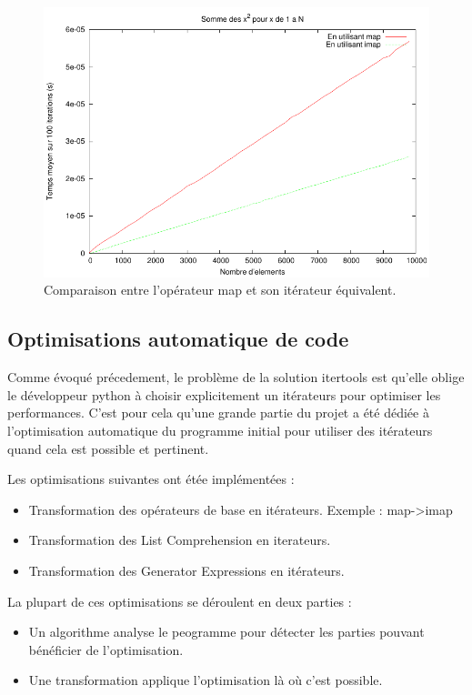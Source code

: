 \documentclass[a4paper]{article}
\begin{document}
\begin{figure}[h]
  \includegraphics[width=\textwidth]{MapImap}
  \caption{Comparaison entre l'opérateur map et son itérateur équivalent.}
\end{figure}


\subsection*{Optimisations automatique de code}

Comme évoqué précedement, le problème de la solution itertools est
qu'elle oblige le développeur python à choisir explicitement un
itérateurs pour optimiser les performances. C'est pour cela qu'une
grande partie du projet a été dédiée à l'optimisation automatique du
programme initial pour utiliser des itérateurs quand cela est possible
et pertinent.

Les optimisations suivantes ont étée implémentées :

\begin{itemize}
\item Transformation des opérateurs de base en itérateurs. Exemple :
  map->imap
\item Transformation des List Comprehension en iterateurs.
\item Transformation des Generator Expressions en itérateurs.
\end{itemize}

La plupart de ces optimisations se déroulent en deux parties :

\begin{itemize}
\item Un algorithme analyse le peogramme pour détecter les parties
  pouvant bénéficier de l'optimisation.
\item Une transformation applique l'optimisation là où c'est possible.
\end{itemize}
\end{document}
